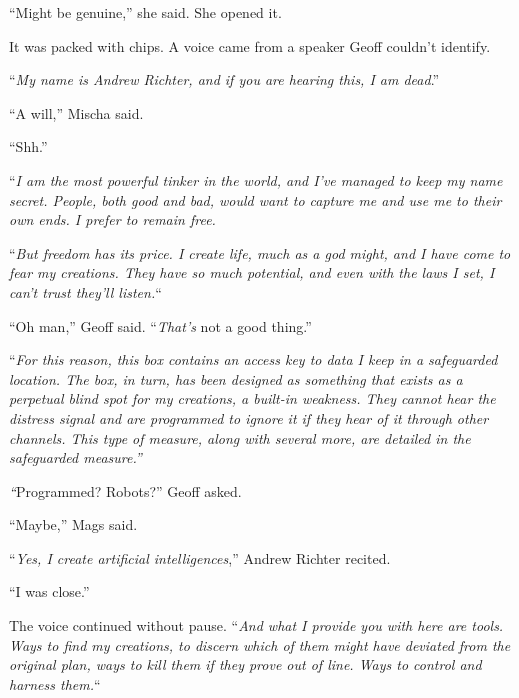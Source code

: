 ``Might be genuine,'' she said.  She opened it.



It was packed with chips.  A voice came from a speaker Geoff couldn't identify.



``\emph{My name is Andrew Richter, and if you are hearing this, I am dead}.''



``A will,'' Mischa said.



``Shh.''



``\emph{I am the most powerful tinker in the world, and I've managed to keep my name secret.  People, both good and bad, would want to capture me and use me to their own ends.  I prefer to remain free.}



``\emph{But freedom has its price.  I create life, much as a god might, and I have come to fear my creations.  They have so much potential, and even with the laws I set, I can't trust they'll listen.}``



``Oh man,'' Geoff said.  ``\emph{That's} not a good thing.''



``\emph{For this reason, this box contains an access key to data I keep in a safeguarded location.  The box, in turn, has been designed as something that exists as a perpetual blind spot for my creations, a built-in weakness.  They cannot hear the distress signal and are programmed to ignore it if they hear of it through other channels.  This type of measure, along with several more, are detailed in the safeguarded measure.''}



\emph{``}Programmed?  Robots?''  Geoff asked.



``Maybe,'' Mags said.



``\emph{Yes, I create artificial intelligences},'' Andrew Richter recited.



``I was close.''



The voice continued without pause.  ``\emph{And what I provide you with here are tools.  Ways to find my creations, to discern which of them might have deviated from the original plan, ways to kill them if they prove out of line.  Ways to control and harness them.}``



